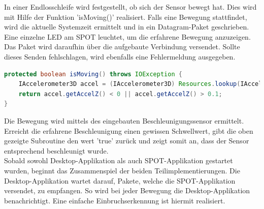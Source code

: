 In einer Endlosschleife wird festgestellt, ob sich der Sensor bewegt hat. Dies wird mit Hilfe der Funktion 'isMoving()' realisiert. Falls eine Bewegung stattfindet, wird die aktuelle Systemzeit ermittelt und in ein Datagram-Paket geschrieben. Eine einzelne LED am SPOT leuchtet, um die erfahrene Bewegung anzuzeigen. Das Paket wird daraufhin über die aufgebaute Verbindung versendet. Sollte dieses Senden fehlschlagen, wird ebenfalls eine Fehlermeldung ausgegeben.

\begin{lstlisting}[language=Java,caption={Methode zur Bewegungserkennung},label=lst:movement,frame=single] 
protected boolean isMoving() throws IOException {
	IAccelerometer3D accel = (IAccelerometer3D) Resources.lookup(IAccelerometer3D.class);
	return accel.getAccelZ() < 0 || accel.getAccelZ() > 0.1;
}
\end{lstlisting}

Die Bewegung wird mittels des eingebauten Beschleunigungssensor ermittelt. Erreicht die erfahrene Beschleunigung einen gewissen Schwellwert, gibt die oben gezeigte Subroutine den wert 'true' zurück und zeigt somit an, dass der Sensor entsprechend beschleunigt wurde.\\

Sobald sowohl Desktop-Applikation als auch SPOT-Applikation gestartet wurden, beginnt das Zusammenspiel der beiden Teilimplementierungen. Die Desktop-Applikation wartet darauf, Pakete, welche die SPOT-Applikation versendet, zu empfangen. So wird bei jeder Bewegung die Desktop-Applikation benachrichtigt. Eine einfache Einbruchserkennung ist hiermit realisiert.
